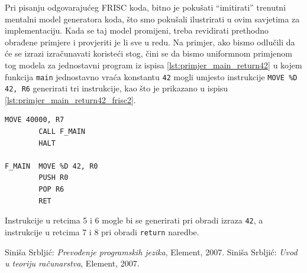 \documentclass[times, 12pt, utf8]{book}
\begin{document}
Pri pisanju odgovarajućeg FRISC koda, bitno je pokušati ``imitirati'' trenutni mentalni model generatora koda, što smo pokušali ilustrirati u ovim savjetima za implementaciju.
Kada se taj model promijeni, treba revidirati prethodno obrađene primjere i provjeriti je li sve u redu.
Na primjer, ako bismo odlučili da će se izrazi izračunavati koristeći stog, čini se da bismo uniformnom primjenom tog modela za jednostavni program iz ispisa \ref{lst:primjer_main_return42} u kojem funkcija \verb|main| jednostavno vraća konstantu \verb|42| mogli umjesto instrukcije \verb|MOVE %D 42, R6| generirati tri instrukcije, kao što je prikazano u ispisu \ref{lst:primjer_main_return42_frisc2}.

\begin{lstlisting}[caption={FRISC mnemonički program za ispis \ref{lst:primjer_main_return42} uz konzistentno računanje izraza pomoću stoga.},label=lst:primjer_main_return42_frisc2]
        MOVE 40000, R7
        CALL F_MAIN
        HALT
        
F_MAIN  MOVE %D 42, R0
        PUSH R0
        POP R6
        RET
\end{lstlisting}

Instrukcije u retcima 5 i 6 mogle bi se generirati pri obradi izraza \verb|42|, a instrukcije u retcima 7 i 8 pri obradi \verb|return| naredbe.


\newpage
{}
\begin{thebibliography}{10}
Siniša Srbljić:
\emph{Prevođenje programskih jezika}, Element, 2007.
Siniša Srbljić:
\emph{Uvod u teoriju računarstva}, Element, 2007.
\end{thebibliography}
\end{document}
